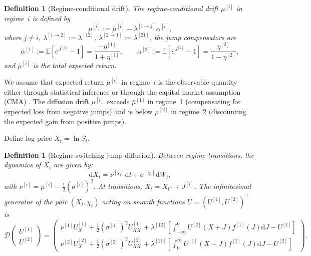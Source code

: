 \documentclass[11pt,a4paper]{article}
\numberwithin{equation}{section}
\newtheorem{definition}[theorem]{Definition}
\newcommand{\E}{\mathbb{E}}
\newcommand{\dd}{\mathrm{d}}
\begin{document}
\begin{definition}[Regime-conditional drift]\label{def:total_return}
The regime-conditional drift $\mu^{[i]}$ in regime~$i$ is defined by
\begin{equation}\label{eq:total_return}
\mu^{[i]} := \bar{\mu}^{[i]} - \lambda^{[i \to j]} \alpha^{[i]},
\end{equation}
where $j \neq i$, $\lambda^{[1 \to 2]} := \lambda^{[12]}$, $\lambda^{[2 \to 1]} := \lambda^{[21]}$, the jump compensators are
\begin{equation}\label{eq:alpha}
\alpha^{[1]} := \E[e^{J^{[1]}} - 1] = \frac{-\eta^{[1]}}{1 + \eta^{[1]}}, \qquad
\alpha^{[2]} := \E[e^{J^{[2]}} - 1] = \frac{\eta^{[2]}}{1 - \eta^{[2]}},
\end{equation}
and $\bar{\mu}^{[i]}$ is the total expected return.
\end{definition}

We assume that expected return $\bar{\mu}^{[i]}$ in regime~$i$ is the observable quantity either through statistical inference or through the capital market assumption (CMA) \citep[see][for a systematic CMA framework]{SeppHansenKastenholz2026}. The diffusion drift $\mu^{[i]}$ exceeds $\bar{\mu}^{[1]}$ in regime~1 (compensating for expected loss from negative jumps) and is below $\bar{\mu}^{[2]}$ in regime~2 (discounting the expected gain from positive jumps).



Define log-price $X_t = \ln S_t$.


\begin{definition}[Regime-switching jump-diffusion]\label{def:jump_diffusion}
Between regime transitions, the dynamics of $X_t$ are given by:
\begin{equation}\label{eq:jump_diffusion}
\dd X_t = \nu^{[\chi_t]} \dd t + \sigma^{[\chi_t]} \dd W_t,
\end{equation}
with $\nu^{[i]} = \mu^{[i]} - \tfrac{1}{2}(\sigma^{[i]})^2$. At transitions, $X_t = X_{t^-} + J^{[i]}$. The infinitesimal generator of the pair $(X_t, \chi_t)$ acting on smooth functions $U = (U^{[1]}, U^{[2]})^\top$ is
\begin{equation}\label{eq:generator_full}
\mathcal{D} \begin{pmatrix} U^{[1]} \\ U^{[2]} \end{pmatrix} =
\begin{pmatrix}
\nu^{[1]} U^{[1]}_X + \tfrac{1}{2}(\sigma^{[1]})^2 U^{[1]}_{XX} + \lambda^{[12]} \left[\int_{-\infty}^{0} U^{[2]}(X+J) f^{[1]}(J) \dd J - U^{[1]}\right] \\[6pt]
\nu^{[2]} U^{[2]}_X + \tfrac{1}{2}(\sigma^{[2]})^2 U^{[2]}_{XX} + \lambda^{[21]} \left[\int_{0}^{\infty} U^{[1]}(X+J) f^{[2]}(J) \dd J - U^{[2]}\right]
\end{pmatrix}.
\end{equation}

\end{definition}
\end{document}
